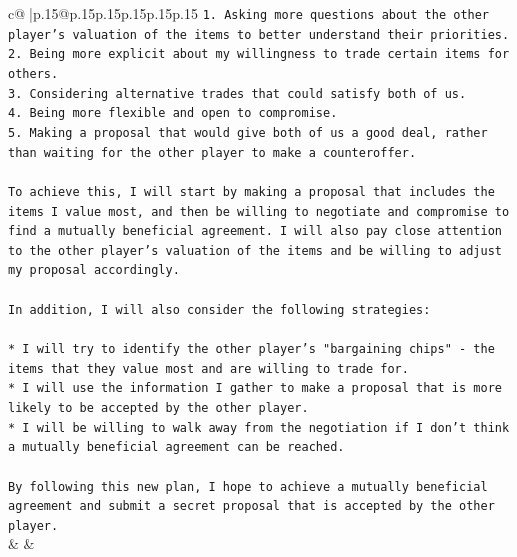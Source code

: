 \documentclass{article}
\begin{document}
{\begin{supertabular}{c@{$\;$}|p{.15\linewidth}@{}p{.15\linewidth}p{.15\linewidth}p{.15\linewidth}p{.15\linewidth}p{.15\linewidth}}
{{{\texttt{1. Asking more questions about the other player's valuation of the items to better understand their priorities.} \\
\texttt{2. Being more explicit about my willingness to trade certain items for others.} \\
\texttt{3. Considering alternative trades that could satisfy both of us.} \\
\texttt{4. Being more flexible and open to compromise.} \\
\texttt{5. Making a proposal that would give both of us a good deal, rather than waiting for the other player to make a counteroffer.} \\
\\ 
\texttt{To achieve this, I will start by making a proposal that includes the items I value most, and then be willing to negotiate and compromise to find a mutually beneficial agreement. I will also pay close attention to the other player's valuation of the items and be willing to adjust my proposal accordingly.} \\
\\ 
\texttt{In addition, I will also consider the following strategies:} \\
\\ 
\texttt{* I will try to identify the other player's "bargaining chips" {-} the items that they value most and are willing to trade for.} \\
\texttt{* I will use the information I gather to make a proposal that is more likely to be accepted by the other player.} \\
\texttt{* I will be willing to walk away from the negotiation if I don't think a mutually beneficial agreement can be reached.} \\
\\ 
\texttt{By following this new plan, I hope to achieve a mutually beneficial agreement and submit a secret proposal that is accepted by the other player.} \\
            }
        }
    }
    & & \\ \\


\end{supertabular}}
\end{document}
